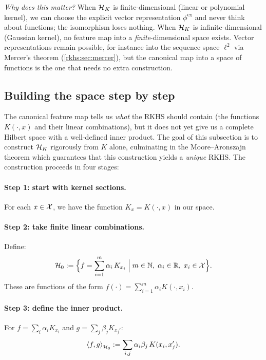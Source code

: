 \begin{notechapter}
\begin{intuition}
\emph{Why does this matter?} When $\mathcal{H}_K$ is
finite-dimensional (linear or polynomial kernel), we
can choose the explicit vector representation
$\phi^{\mathrm{ex}}$ and never think about functions;
the isomorphism loses nothing. When $\mathcal{H}_K$ is
infinite-dimensional (Gaussian kernel), no feature map into a \emph{finite}-dimensional space exists. Vector representations remain possible, for instance into the sequence space $\ell^2$ via Mercer's theorem (\cref{rkhs:sec:mercer}), but the canonical map into a space of functions is the one that needs no extra construction.
\end{intuition}

\subsection{Building the space step by step}
\label{rkhs:subsec:building_space}

The canonical feature map tells us \emph{what} the
RKHS should contain (the functions $K(\cdot, x)$ and
their linear combinations), but it does not yet give
us a complete Hilbert space with a well-defined inner
product. The goal of this subsection is to construct
$\mathcal{H}_K$ rigorously from $K$ alone, culminating in the
Moore--Aronszajn theorem which guarantees that this
construction yields a \emph{unique} RKHS. The
construction proceeds in four stages:

\paragraph{Step 1: start with kernel sections.} For each $x \in \mathcal{X}$, we
have the function $K_x = K(\cdot, x)$ in our space.

\paragraph{Step 2: take finite linear combinations.} Define:
\[
\mathcal{H}_0 := \Bigl\{ f = \sum_{i=1}^m \alpha_i\, K_{x_i} \;\Big|\; m \in
\mathbb{N},\; \alpha_i \in \mathbb{R},\; x_i \in \mathcal{X} \Bigr\}.
\]
These are functions of the form $f(\cdot) = \sum_{i=1}^m \alpha_i
K(\cdot, x_i)$.

\paragraph{Step 3: define the inner product.} For $f = \sum_i \alpha_i
K_{x_i}$ and $g = \sum_j \beta_j K_{x_j'}$:
\begin{equation}
\label{rkhs:eq:inner_product_h0}
\left\langle f, g \right\rangle_{\mathcal{H}_0} := \sum_{i,j} \alpha_i \beta_j\, K(x_i, x_j').
\end{equation}


\end{notechapter}
